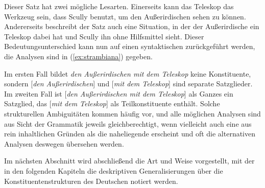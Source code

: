\begin{exe}
\end{exe}

Dieser Satz hat zwei mögliche Lesarten.
Einerseits kann das Teleskop das Werkzeug sein, dass Scully benutzt, um den Außerirdischen sehen zu können.
Andererseits beschreibt der Satz auch eine Situation, in der der Außerirdische ein Teleskop dabei hat und Scully ihn ohne Hilfsmittel sieht.
Dieser Bedeutungsunterschied kann nun auf einen syntaktischen zurückgeführt werden, die Analysen sind in (\ref{ex:strambiana}) gegeben.

\begin{exe}
  \ex\label{ex:strambiana}
  \begin{xlist}
  \end{xlist}
\end{exe}

Im ersten Fall bildet \textit{den Außerirdischen mit dem Teleskop} keine Konstituente, sondern [\textit{den Außerirdischen}] und [\textit{mit dem Teleskop}] sind separate Satzglieder.
Im zweiten Fall ist [\textit{den Außerirdischen mit dem Teleskop}] als Ganzes ein Satzglied, das [\textit{mit dem Teleskop}] als Teilkonstituente enthält.
Solche strukturellen Ambiguitäten kommen häufig vor, und alle möglichen Analysen sind aus Sicht der Grammatik jeweils gleichberechtigt, wenn vielleicht auch eine aus rein inhaltlichen Gründen als die naheliegende erscheint und oft die alternativen Analysen deswegen übersehen werden.


Im nächsten Abschnitt wird abschließend die Art und Weise vorgestellt, mit der in den folgenden Kapiteln die deskriptiven Generalisierungen über die Konstituentenstrukturen des Deutschen notiert werden.




